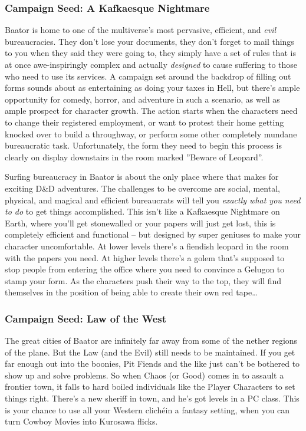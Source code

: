 \subsubsection{Campaign Seed: A Kafkaesque Nightmare}

Baator is home to one of the multiverse's most pervasive, efficient, and \textit{evil} bureaucracies. They don't lose your documents, they don't forget to mail things to you when they said they were going to, they simply have a set of rules that is at once awe-inspiringly complex and actually \textit{designed} to cause suffering to those who need to use its services. A campaign set around the backdrop of filling out forms sounds about as entertaining as doing your taxes in Hell, but there's ample opportunity for comedy, horror, and adventure in such a scenario, as well as ample prospect for character growth. The action starts when the characters need to change their registered employment, or want to protest their home getting knocked over to build a throughway, or perform some other completely mundane bureaucratic task. Unfortunately, the form they need to begin this process is clearly on display downstairs in the room marked ''Beware of Leopard''.

Surfing bureaucracy in Baator is about the only place where that makes for exciting D\&D adventures. The challenges to be overcome are social, mental, physical, and magical and efficient bureaucrats will tell you \textit{exactly what you need to do} to get things accomplished. This isn't like a Kafkaesque Nightmare on Earth, where you'll get stonewalled or your papers will just get lost, this is completely efficient and functional -- but designed by super geniuses to make your character uncomfortable. At lower levels there's a fiendish leopard in the room with the papers you need. At higher levels there's a golem that's supposed to stop people from entering the office where you need to convince a Gelugon to stamp your form. As the characters push their way to the top, they will find themselves in the position of being able to create their own red tape\ldots


\subsubsection{Campaign Seed: Law of the West}

The great cities of Baator are infinitely far away from some of the nether regions of the plane. But the Law (and the Evil) still needs to be maintained. If you get far enough out into the boonies, Pit Fiends and the like just can't be bothered to show up and solve problems. So when Chaos (or Good) comes in to assault a frontier town, it falls to hard boiled individuals like the Player Characters to set things right. There's a new sheriff in town, and he's got levels in a PC class. This is your chance to use all your Western clichéin a fantasy setting, when you can turn Cowboy Movies into Kurosawa flicks.

